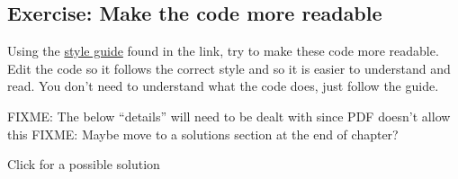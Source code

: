 \documentclass[]{Nemilov}
\newenvironment{Shaded}{\begin{snugshade}}{\end{snugshade}}
\newcommand{\CommentTok}[1]{\textcolor[rgb]{0.56,0.35,0.01}{\textit{#1}}}
\newcommand{\ControlFlowTok}[1]{\textcolor[rgb]{0.13,0.29,0.53}{\textbf{#1}}}
\newcommand{\DataTypeTok}[1]{\textcolor[rgb]{0.13,0.29,0.53}{#1}}
\newcommand{\DecValTok}[1]{\textcolor[rgb]{0.00,0.00,0.81}{#1}}
\newcommand{\KeywordTok}[1]{\textcolor[rgb]{0.13,0.29,0.53}{\textbf{#1}}}
\newcommand{\NormalTok}[1]{#1}
\newcommand{\OperatorTok}[1]{\textcolor[rgb]{0.81,0.36,0.00}{\textbf{#1}}}
\newcommand{\OtherTok}[1]{\textcolor[rgb]{0.56,0.35,0.01}{#1}}
\newcommand{\StringTok}[1]{\textcolor[rgb]{0.31,0.60,0.02}{#1}}
\begin{document}
\hypertarget{exercise-make-the-code-more-readable}{%
\subsection{Exercise: Make the code more readable}\label{exercise-make-the-code-more-readable}}

Using the \href{https://style.tidyverse.org/}{style guide} found in the link, try to make these code
more readable. Edit the code so it follows the correct style and so it is easier to
understand and read. You don't need to understand what the code does, just
follow the guide.

\begin{Shaded}
\end{Shaded}

FIXME: The below ``details'' will need to be dealt with since PDF doesn't allow this
FIXME: Maybe move to a solutions section at the end of chapter?

Click for a possible solution
\end{document}
